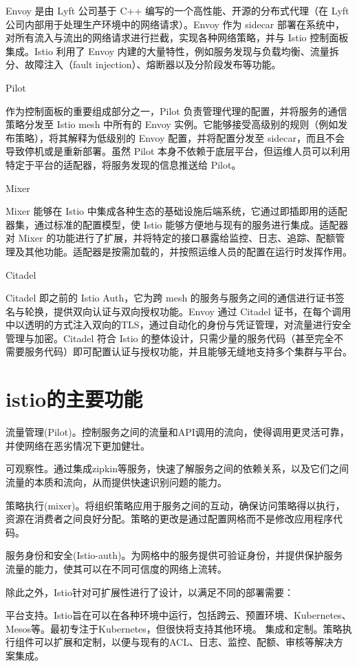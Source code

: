 \documentclass{ctexart}
\begin{document}
Envoy 是由 Lyft 公司基于 C++ 编写的一个高性能、开源的分布式代理（在 Lyft 公司内部用于处理生产环境中的网络请求）。Envoy 作为 sidecar 部署在系统中，对所有流入与流出的网络请求进行拦截，实现各种网络策略，并与 Istio 控制面板集成。Istio 利用了 Envoy 内建的大量特性，例如服务发现与负载均衡、流量拆分、故障注入（fault injection）、熔断器以及分阶段发布等功能。

Pilot

作为控制面板的重要组成部分之一，Pilot 负责管理代理的配置，并将服务的通信策略分发至 Istio mesh 中所有的 Envoy 实例。它能够接受高级别的规则（例如发布策略），将其解释为低级别的 Envoy 配置，并将配置分发至 sidecar，而且不会导致停机或是重新部署。虽然 Pilot 本身不依赖于底层平台，但运维人员可以利用特定于平台的适配器，将服务发现的信息推送给 Pilot。

Mixer

Mixer 能够在 Istio 中集成各种生态的基础设施后端系统，它通过即插即用的适配器集，通过标准的配置模型，使 Istio 能够方便地与现有的服务进行集成。适配器对 Mixer 的功能进行了扩展，并将特定的接口暴露给监控、日志、追踪、配额管理及其他功能。适配器是按需加载的，并按照运维人员的配置在运行时发挥作用。

Citadel

Citadel 即之前的 Istio Auth，它为跨 mesh 的服务与服务之间的通信进行证书签名与轮换，提供双向认证与双向授权功能。Envoy 通过 Citadel 证书，在每个调用中以透明的方式注入双向的TLS，通过自动化的身份与凭证管理，对流量进行安全管理与加密。Citadel 符合 Istio 的整体设计，只需少量的服务代码（甚至完全不需要服务代码）即可配置认证与授权功能，并且能够无缝地支持多个集群与平台。


\section{istio的主要功能}
流量管理(Pilot)。控制服务之间的流量和API调用的流向，使得调用更灵活可靠，并使网络在恶劣情况下更加健壮。

可观察性。通过集成zipkin等服务，快速了解服务之间的依赖关系，以及它们之间流量的本质和流向，从而提供快速识别问题的能力。

策略执行(mixer)。将组织策略应用于服务之间的互动，确保访问策略得以执行，资源在消费者之间良好分配。策略的更改是通过配置网格而不是修改应用程序代码。

服务身份和安全(Istio-auth)。为网格中的服务提供可验证身份，并提供保护服务流量的能力，使其可以在不同可信度的网络上流转。

除此之外，Istio针对可扩展性进行了设计，以满足不同的部署需要：

平台支持。Istio旨在可以在各种环境中运行，包括跨云、预置环境、Kubernetes、Mesos等。最初专注于Kubernetes，但很快将支持其他环境。
集成和定制。策略执行组件可以扩展和定制，以便与现有的ACL、日志、监控、配额、审核等解决方案集成。
\end{document}
